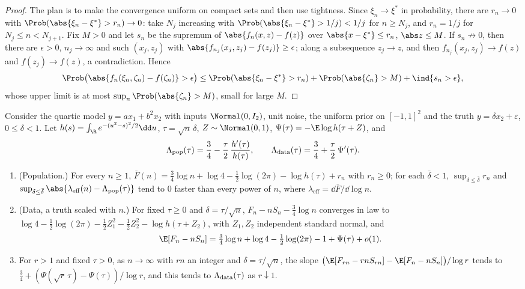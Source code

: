 \begin{refsection}
\begin{proof}
The plan is to make the convergence uniform on compact sets and then use tightness. Since $\xi_n\to\xi^*$ in probability, there are $r_n\to0$ with $\Prob(\abs{\xi_n-\xi^*}>r_n)\to0$: take $N_j$ increasing with $\Prob(\abs{\xi_n-\xi^*}>1/j)<1/j$ for $n\ge N_j$, and $r_n=1/j$ for $N_j\le n<N_{j+1}$. Fix $M>0$ and let $s_n$ be the supremum of $\abs{f_n(x,z)-f(z)}$ over $\abs{x-\xi^*}\le r_n$, $\abs z\le M$. If $s_n\not\to0$, then there are $\epsilon>0$, $n_j\to\infty$ and such $(x_j,z_j)$ with $\abs{f_{n_j}(x_j,z_j)-f(z_j)}\ge\epsilon$; along a subsequence $z_j\to z$, and then $f_{n_j}(x_j,z_j)\to f(z)$ and $f(z_j)\to f(z)$, a contradiction. Hence
\[
\Prob\bigl(\abs{f_n(\xi_n,\zeta_n)-f(\zeta_n)}>\epsilon\bigr)\le\Prob(\abs{\xi_n-\xi^*}>r_n)+\Prob(\abs{\zeta_n}>M)+\ind\{s_n>\epsilon\},
\]
whose upper limit is at most $\sup_n\Prob(\abs{\zeta_n}>M)$, small for large $M$.
\end{proof}

\begin{proposition}\label{prop:phases:crossover}
Consider the quartic model $y=ax_1+b^2x_2$ with inputs $\Normal(0,I_2)$, unit noise, the uniform prior on $[-1,1]^2$ and the truth $y=\delta x_2+\varepsilon$, $0\le\delta<1$. Let $h(s)=\int_\R e^{-(u^2-s)^2/2}\dd u$, $\tau=\sqrt n\,\delta$, $Z\sim\Normal(0,1)$, $\Psi(\tau)=-\E\log h(\tau+Z)$, and
\[
\Lambda_{\mathrm{pop}}(\tau)=\frac34-\frac\tau2\,\frac{h'(\tau)}{h(\tau)},\qquad\Lambda_{\mathrm{data}}(\tau)=\frac34+\frac\tau2\,\Psi'(\tau).
\]
\begin{enumerate}[label=(\roman*)]
\item (Population.) For every $n\ge1$, $\bar F(n)=\frac34\log n+\log4-\frac12\log(2\pi)-\log h(\tau)+r_n$ with $r_n\ge0$; for each $\bar\delta<1$, $\sup_{\delta\le\bar\delta}r_n$ and $\sup_{\delta\le\bar\delta}\abs{\lambda_{\mathrm{eff}}(n)-\phasesLpop(\tau)}$ tend to $0$ faster than every power of $n$, where $\lambda_{\mathrm{eff}}=\dd\bar F/\dd\log n$.
\item (Data, a truth scaled with $n$.) For fixed $\tau\ge0$ and $\delta=\tau/\sqrt n$, $F_n-nS_n-\frac34\log n$ converges in law to $\log4-\frac12\log(2\pi)-\frac12Z_1^2-\frac12Z_2^2-\log h(\tau+Z_2)$, with $Z_1,Z_2$ independent standard normal, and
\[
\E[F_n-nS_n]=\tfrac34\log n+\log4-\tfrac12\log(2\pi)-1+\Psi(\tau)+o(1).
\]
\item For $r>1$ and fixed $\tau>0$, as $n\to\infty$ with $rn$ an integer and $\delta=\tau/\sqrt n$, the slope $\bigl(\E[F_{rn}-rnS_{rn}]-\E[F_n-nS_n]\bigr)/\log r$ tends to $\frac34+(\Psi(\sqrt r\,\tau)-\Psi(\tau))/\log r$, and this tends to $\Lambda_{\mathrm{data}}(\tau)$ as $r\downarrow1$.
\end{enumerate}
\end{proposition}


\end{refsection}
